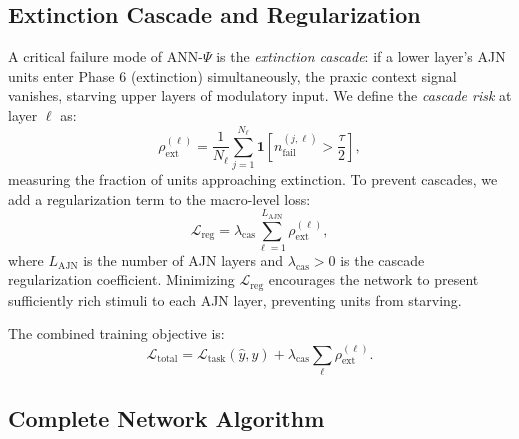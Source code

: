 \documentclass[12pt,a4paper]{article}
\begin{document}
\subsection{Extinction Cascade and Regularization}

A critical failure mode of ANN-$\Psi$ is the \textit{extinction cascade}: if a
lower layer's AJN units enter Phase 6 (extinction) simultaneously, the praxic
context signal vanishes, starving upper layers of modulatory input. We define the
\textit{cascade risk} at layer $\ell$ as:
\begin{equation}
\rho_{\text{ext}}^{(\ell)} = \frac{1}{N_\ell}\sum_{j=1}^{N_\ell}
\mathbf{1}\!\left[n_{\text{fail}}^{(j,\ell)} > \frac{\tau}{2}\right],
\label{eq:cascade_risk}
\end{equation}
measuring the fraction of units approaching extinction. To prevent cascades, we
add a regularization term to the macro-level loss:
\begin{equation}
\mathcal{L}_{\text{reg}} = \lambda_{\text{cas}} \sum_{\ell=1}^{L_{\text{AJN}}}
\rho_{\text{ext}}^{(\ell)},
\label{eq:reg}
\end{equation}
where $L_{\text{AJN}}$ is the number of AJN layers and $\lambda_{\text{cas}} > 0$
is the cascade regularization coefficient. Minimizing $\mathcal{L}_{\text{reg}}$
encourages the network to present sufficiently rich stimuli to each AJN layer,
preventing units from starving.

The combined training objective is:
\begin{equation}
\mathcal{L}_{\text{total}} = \mathcal{L}_{\text{task}}(\hat{y}, y)
+ \lambda_{\text{cas}} \sum_{\ell} \rho_{\text{ext}}^{(\ell)}.
\label{eq:total_loss}
\end{equation}

\subsection{Complete Network Algorithm}
\end{document}
